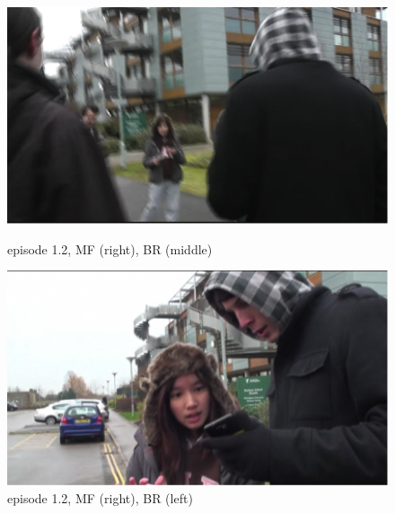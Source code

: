 \begin{figure}[ht]
\centering
\begin{minipage}[b]{0.45\linewidth}
\includegraphics[width=1\textwidth]{img/study1/ep2/ep21}
\caption{episode 1.2, MF (right), BR (middle)}
\label{fig:study2ep21}
\end{minipage}
\quad
\begin{minipage}[b]{0.45\linewidth}
 \includegraphics[width=1\textwidth]{img/study1/ep2/ep22}
\caption{episode 1.2, MF (right), BR (left)}
\label{fig:study2ep22}
\end{minipage}
\end{figure}

